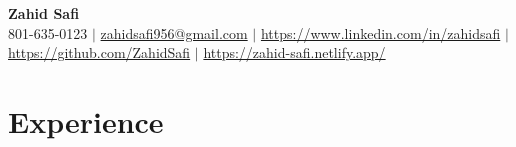 \documentclass[letterpaper,11pt]{article}
\begin{document}
\begin{center}
	\textbf{\Huge Zahid Safi} \\ \vspace{1pt}
	\small 801-635-0123 $|$ \href{mailto:zahidsafi956@gmail.com}{{zahidsafi956@gmail.com}} $|$
	\href{https://www.linkedin.com/in/zahidsafi}{{https://www.linkedin.com/in/zahidsafi}} $|$
	\href{https://github.com/ZahidSafi}{{https://github.com/ZahidSafi}} $|$
	\href{https://zahid-safi.netlify.app/}{https://zahid-safi.netlify.app/}
\end{center}



\section{\textbf{Experience}}
\end{document}
